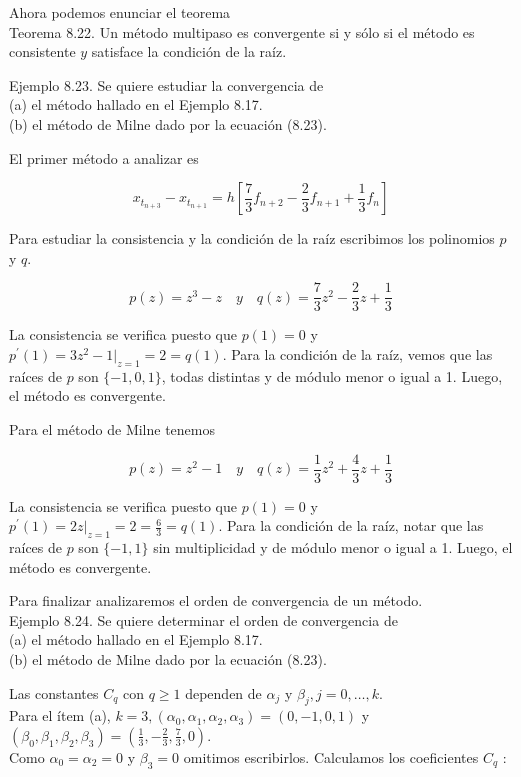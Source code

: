 \documentclass[10pt]{article}
\begin{document}
Ahora podemos enunciar el teorema\\
Teorema 8.22. Un método multipaso es convergente si y sólo si el método es consistente $y$ satisface la condición de la raíz.

Ejemplo 8.23. Se quiere estudiar la convergencia de\\
(a) el método hallado en el Ejemplo 8.17.\\
(b) el método de Milne dado por la ecuación (8.23).

El primer método a analizar es

$$
x_{t_{n+3}}-x_{t_{n+1}}=h\left[\frac{7}{3} f_{n+2}-\frac{2}{3} f_{n+1}+\frac{1}{3} f_{n}\right]
$$

Para estudiar la consistencia y la condición de la raíz escribimos los polinomios $p$ y $q$.

$$
p(z)=z^{3}-z \quad y \quad q(z)=\frac{7}{3} z^{2}-\frac{2}{3} z+\frac{1}{3}
$$

La consistencia se verifica puesto que $p(1)=0$ y $p^{\prime}(1)=3 z^{2}-\left.1\right|_{z=1}=2=q(1)$. Para la condición de la raíz, vemos que las raíces de $p$ son $\{-1,0,1\}$, todas distintas y de módulo menor o igual a 1. Luego, el método es convergente.

Para el método de Milne tenemos

$$
p(z)=z^{2}-1 \quad y \quad q(z)=\frac{1}{3} z^{2}+\frac{4}{3} z+\frac{1}{3}
$$

La consistencia se verifica puesto que $p(1)=0$ y $p^{\prime}(1)=\left.2 z\right|_{z=1}=2=\frac{6}{3}=q(1)$. Para la condición de la raíz, notar que las raíces de $p$ son $\{-1,1\}$ sin multiplicidad y de módulo menor o igual a 1. Luego, el método es convergente.

Para finalizar analizaremos el orden de convergencia de un método.\\
Ejemplo 8.24. Se quiere determinar el orden de convergencia de\\
(a) el método hallado en el Ejemplo 8.17.\\
(b) el método de Milne dado por la ecuación (8.23).

Las constantes $C_{q}$ con $q \geq 1$ dependen de $\alpha_{j}$ y $\beta_{j}, j=0, \ldots, k$.\\
Para el ítem (a), $k=3,\left(\alpha_{0}, \alpha_{1}, \alpha_{2}, \alpha_{3}\right)=(0,-1,0,1)$ y $\left(\beta_{0}, \beta_{1}, \beta_{2}, \beta_{3}\right)=\left(\frac{1}{3},-\frac{2}{3}, \frac{7}{3}, 0\right)$.\\
Como $\alpha_{0}=\alpha_{2}=0$ y $\beta_{3}=0$ omitimos escribirlos. Calculamos los coeficientes $C_{q}$ :
\end{document}
